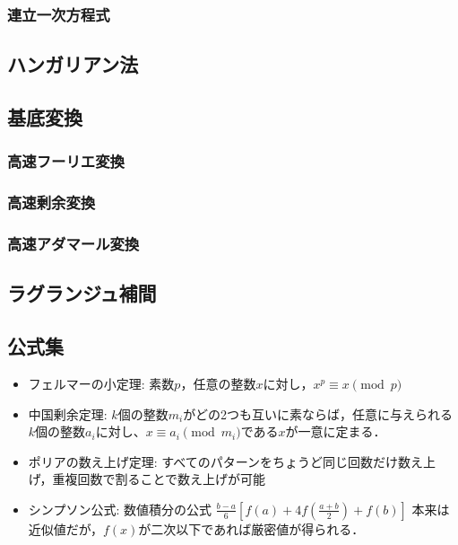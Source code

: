 \subsubsection{連立一次方程式} 

\subsection{ハンガリアン法}

\subsection{基底変換}

\subsubsection{高速フーリエ変換}

\subsubsection{高速剰余変換} 

\subsubsection{高速アダマール変換} 

\subsection{ラグランジュ補間} 

\subsection{公式集}

\begin{itemize}
\setlength{\parskip}{0cm} %
\setlength{\itemsep}{0cm} %
\item フェルマーの小定理: 素数$p$，任意の整数$x$に対し，$x^p \equiv x \pmod{p}$
\item 中国剰余定理: $k$個の整数$m_i$がどの2つも互いに素ならば，任意に与えられる$k$個の整数$a_i$に対し、$x \equiv a_i \pmod{m_i}$である$x$が一意に定まる．
\item ポリアの数え上げ定理: すべてのパターンをちょうど同じ回数だけ数え上げ，重複回数で割ることで数え上げが可能
\item シンプソン公式: 数値積分の公式 $\frac{b-a}{6}\left[ f(a)+4f(\frac{a+b}{2})+f(b) \right]$ 本来は近似値だが，$f(x)$が二次以下であれば厳密値が得られる． 
\end{itemize}
